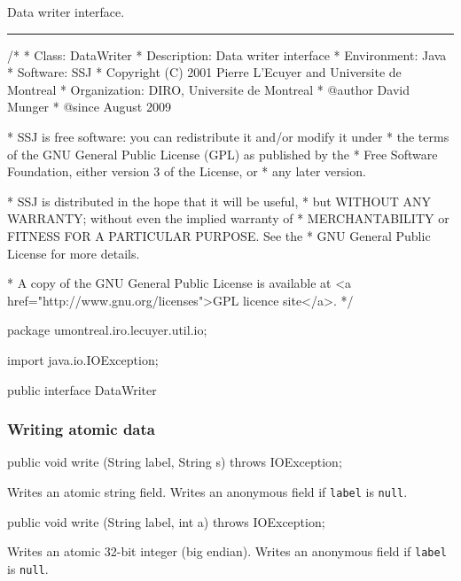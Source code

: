 
Data writer interface.

\bigskip\hrule

\begin{code}
\begin{hide}
/*
 * Class:        DataWriter
 * Description:  Data writer interface
 * Environment:  Java
 * Software:     SSJ 
 * Copyright (C) 2001  Pierre L'Ecuyer and Universite de Montreal
 * Organization: DIRO, Universite de Montreal
 * @author       David Munger 
 * @since        August 2009

 * SSJ is free software: you can redistribute it and/or modify it under
 * the terms of the GNU General Public License (GPL) as published by the
 * Free Software Foundation, either version 3 of the License, or
 * any later version.

 * SSJ is distributed in the hope that it will be useful,
 * but WITHOUT ANY WARRANTY; without even the implied warranty of
 * MERCHANTABILITY or FITNESS FOR A PARTICULAR PURPOSE.  See the
 * GNU General Public License for more details.

 * A copy of the GNU General Public License is available at
   <a href="http://www.gnu.org/licenses">GPL licence site</a>.
 */
\end{hide}
package umontreal.iro.lecuyer.util.io;
\begin{hide}
import java.io.IOException;
\end{hide}

public interface DataWriter \begin{hide} {

\end{hide}
\end{code}


\subsubsection*{Writing atomic data}
\begin{code}

   public void write (String label, String s) throws IOException;
\end{code}
\begin{tabb}
Writes an atomic string field.
Writes an anonymous field if \texttt{label} is \texttt{null}.
\end{tabb}

\begin{code}

   public void write (String label, int a) throws IOException;
\end{code}
\begin{tabb}
Writes an atomic 32-bit integer (big endian).
Writes an anonymous field if \texttt{label} is \texttt{null}.
\end{tabb}

